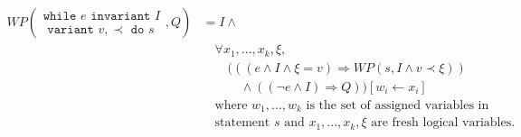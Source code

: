 \begin{align*}
	WP\left(
     \begin{array}{c}
     \texttt{while } e \texttt{ invariant } I \\
     \texttt{ variant } v, \prec \texttt{ do } s
     \end{array}
    , Q \right) 
    &= 
		I \land \\
    &\quad \forall x_1, ..., x_k, \xi, \\
    &\quad \quad (((e \land I \land \xi = v) \Rightarrow WP(s, I \land v \prec \xi)) \\
    &\quad \quad \quad \land ((\neg e \land I) \Rightarrow Q)) [w_i \leftarrow x_i] \\
	&\quad \text{where } w_1, ..., w_k \text{ is the set of assigned variables in} \\
  &\quad \text{statement } s \text{ and } x_1, ..., x_k, \xi \text{ are fresh logical variables.}
\end{align*}








